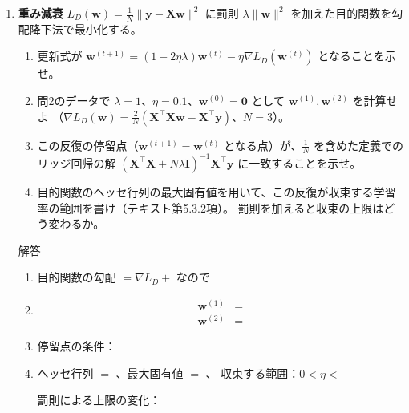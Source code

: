 \documentclass[a4paper,dvipdfmx]{jsarticle}
\newcommand{\提出期限}{2026年11月2日（月）}
\newcommand{\学籍番号}{0000000}
\newcommand{\氏名}{氏名を書く}
\newcommand{\提出日}{2026年11月2日}
\newenvironment{answer}{\begin{itembox}[l]{解答}}{\end{itembox}}
\begin{document}
\begin{enumerate}
  \item \textbf{重み減衰}\quad
    $L_D(\bm{w}) = \frac{1}{N}\|\bm{y} - \bm{X}\bm{w}\|^2$ に罰則 $\lambda\|\bm{w}\|^2$ を加えた目的関数を勾配降下法で最小化する。
    \begin{enumerate}
      \item 更新式が $\bm{w}^{(t+1)} = (1 - 2\eta\lambda)\bm{w}^{(t)} - \eta\nabla L_D(\bm{w}^{(t)})$ となることを示せ。
      \item 問2のデータで $\lambda = 1$、$\eta = 0.1$、$\bm{w}^{(0)} = \bm{0}$ として $\bm{w}^{(1)}, \bm{w}^{(2)}$ を計算せよ
        （$\nabla L_D(\bm{w}) = \frac{2}{N}(\bm{X}^\top\bm{X}\bm{w} - \bm{X}^\top\bm{y})$、$N = 3$）。
      \item この反復の停留点（$\bm{w}^{(t+1)} = \bm{w}^{(t)}$ となる点）が、$\frac{1}{N}$ を含めた定義でのリッジ回帰の解
        $(\bm{X}^\top\bm{X} + N\lambda\bm{I})^{-1}\bm{X}^\top\bm{y}$ に一致することを示せ。
      \item 目的関数のヘッセ行列の最大固有値を用いて、この反復が収束する学習率の範囲を書け（テキスト第5.3.2項）。
        罰則を加えると収束の上限はどう変わるか。
    \end{enumerate}
    \begin{answer}
      \begin{enumerate}
        \item 目的関数の勾配 $= \nabla L_D + $ \phantom{XXXXXX} なので
          \vspace{10mm}
        \item
          \begin{align*}
            \bm{w}^{(1)} &= \\
            \bm{w}^{(2)} &=
          \end{align*}
        \item 停留点の条件：\phantom{XXXXXXXXXXXXXXXX}
          \vspace{12mm}
        \item ヘッセ行列 $= $ \phantom{XXXXXXXXXX}、最大固有値 $= $ \phantom{XXXXXX}、
          収束する範囲：$0 < \eta < $ \phantom{XXXXXX}
          \vspace{2mm}

          罰則による上限の変化：
          \vspace{8mm}
      \end{enumerate}
    \end{answer}


\end{enumerate}
\end{document}
